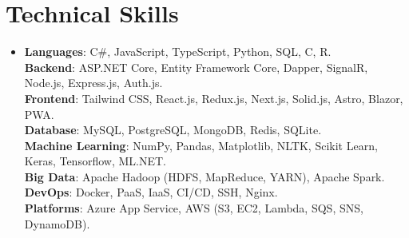 \documentclass[11pt,a4paper]{article}
\begin{document}
\section{Technical Skills}
 \begin{itemize}[leftmargin=0in, label={}]
    \item{
     \textbf{Languages}{: C\#, JavaScript, TypeScript, Python, SQL, C, R.} \\
     \textbf{Backend}{: ASP.NET Core, Entity Framework Core, Dapper, SignalR, Node.js, Express.js, Auth.js.} \\
     \textbf{Frontend}{: Tailwind CSS, React.js, Redux.js, Next.js, Solid.js, Astro, Blazor, PWA.} \\
     \textbf{Database}{: MySQL, PostgreSQL, MongoDB, Redis, SQLite.} \\
     \textbf{Machine Learning}{: NumPy, Pandas, Matplotlib, NLTK, Scikit Learn, Keras, Tensorflow, ML.NET.} \\
     \textbf{Big Data}{: Apache Hadoop (HDFS, MapReduce, YARN), Apache Spark.} \\
     \textbf{DevOps}{: Docker, PaaS, IaaS, CI/CD, SSH, Nginx.} \\
     \textbf{Platforms}{: Azure App Service, AWS (S3, EC2, Lambda, SQS, SNS, DynamoDB).} \\
    }
 \end{itemize}
 \vspace{-16pt}

\end{document}
